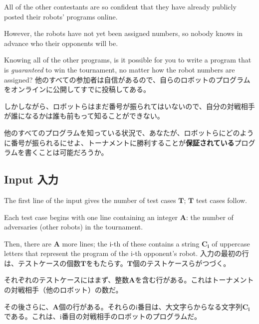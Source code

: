 \documentclass[uplatex,dvipdfmx]{jsarticle} \usepackage{amsmath,amssymb,bm}
\begin{document}
\vspace{\baselineskip}
\begin{paracol}{2}
All of the other contestants are so confident that they have already publicly posted their robots' programs online.

However, the robots have not yet been assigned numbers, so nobody knows in advance who their opponents will be.

Knowing all of the other programs, is it possible for you to write a program that is {\it guaranteed} to win the tournament, no matter how the robot numbers are assigned?
\switchcolumn
他のすべての参加者は自信があるので、自らのロボットのプログラムをオンラインに公開してすでに投稿してある。

しかしながら、ロボットらはまだ番号が振られてはいないので、自分の対戦相手が誰になるかは誰も前もって知ることができない。

他のすべてのプログラムを知っている状況で、あなたが、ロボットらにどのように番号が振られるにせよ、トーナメントに勝利することが{\bf 保証されている}プログラムを書くことは可能だろうか。
\end{paracol}
\subsection*{Input 入力}
\begin{paracol}{2}
The first line of the input gives the number of test cases $\mathbf{T}$; $\mathbf{T}$ test cases follow.

Each test case begins with one line containing an integer $\mathbf{A}$: the number of adversaries (other robots) in the tournament.

Then, there are $\mathbf{A}$ more lines; the i-th of these contains a string $\mathbf{C_i}$ of uppercase letters that represent the program of the i-th opponent's robot.
\switchcolumn
入力の最初の行は、テストケースの個数$\mathbf{T}$をもたらす。$\mathbf{T}$個のテストケースらがつづく。

それぞれのテストケースにはまず、整数$\mathbf{A}$を含む行がある。これはトーナメントの対戦相手（他のロボット）の数だ。

その後さらに、$\mathbf{A}$個の行がある。それらのi番目は、大文字らからなる文字列$\mathbf{C_i}$である。これは、i番目の対戦相手のロボットのプログラムだ。
\end{paracol}
\end{document}
